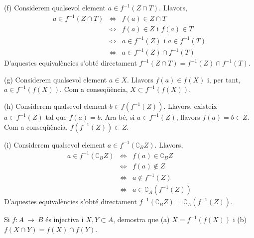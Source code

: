 \begin{solucio}
(f) Considerem qualsevol element $a\in f^{-1}(Z\cap T)$. Llavors,%
\begin{equation*}
\begin{array}{lll}
a\in f^{-1}(Z\cap T) & \Longleftrightarrow & f(a)\in Z\cap T \\
& \Longleftrightarrow & f(a)\in Z\text{ \ i \ }f(a)\in T \\
& \Longleftrightarrow & a\in f^{-1}(Z)\text{ \ i \ }a\in f^{-1}(T) \\
& \Longleftrightarrow & a\in f^{-1}(Z)\cap f^{-1}(T)%
\end{array}%
\end{equation*}%
D'aquestes equivalències s'obté directament $f^{-1}(Z\cap
T)=f^{-1}(Z)\cap f^{-1}(T)$.

(g) Considerem qualsevol element $a\in X$. Llavors $f(a)\in f(X)$ i, per
tant, $a\in f^{-1}\left( f(X)\right) $. Com a conseqüència, $%
X\subset f^{-1}\left( f(X)\right) $.

(h) Considerem qualsevol element $b\in f\left( f^{-1}(Z)\right) $. Llavors,
existeix $a\in f^{-1}(Z)$ tal que $f(a)=b$. Ara bé, si $a\in f^{-1}(Z)$,
llavors $f(a)=b\in Z$. Com a conseqüència, $f\left( f^{-1}(Z)\right)
\subset Z$.

(i) Considerem qualsevol element $a\in f^{-1}\left( \complement _{B}Z\right)
$. Llavors,%
\begin{equation*}
\begin{array}{lll}
a\in f^{-1}\left( \complement _{B}Z\right) & \Longleftrightarrow & f(a)\in
\complement _{B}Z \\
& \Longleftrightarrow & f(a)\notin Z \\
& \Longleftrightarrow & a\notin f^{-1}(Z) \\
& \Longleftrightarrow & a\in \complement _{A}\left( f^{-1}(Z)\right)%
\end{array}%
\end{equation*}%
D'aquestes equivalències s'obté directament $f^{-1}\left(
\complement _{B}Z\right) =\complement _{A}\left( f^{-1}(Z)\right) $.
\end{solucio}

\begin{exercici}
Si $f:A~\longrightarrow ~B$ és injectiva i $X,Y\subset A$, demostra que
(a) $X=f^{-1}\left( f(X)\right) $ i (b) $f(X\cap Y)=f(X)\cap f(Y)$.
\end{exercici}

